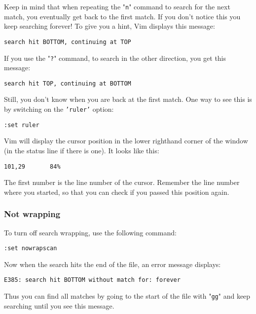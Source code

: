 Keep in mind that when repeating the "\texttt{n}" command to search for the next match, you eventually get back to the first match.
If you don't notice this you keep searching forever!  To give you a hint, Vim displays this message:

\begin{Verbatim}[samepage=true]
    search hit BOTTOM, continuing at TOP 
\end{Verbatim}

If you use the "\texttt{?}" command, to search in the other direction, you get this message:

\begin{Verbatim}[samepage=true]
    search hit TOP, continuing at BOTTOM 
\end{Verbatim}

Still, you don't know when you are back at the first match.
One way to see this is by switching on the \texttt{'ruler'} option:

\begin{Verbatim}[samepage=true]
 :set ruler
\end{Verbatim}

Vim will display the cursor position in the lower righthand corner of the window (in the status line if there is one).
It looks like this:

\begin{Verbatim}[samepage=true]
    101,29       84% 
\end{Verbatim}

The first number is the line number of the cursor.
Remember the line number where you started, so that you can check if you passed this position again.
\subsubsection{Not wrapping}
To turn off search wrapping, use the following command:

\begin{Verbatim}[samepage=true]
 :set nowrapscan
\end{Verbatim}

Now when the search hits the end of the file, an error message displays:

\begin{Verbatim}[samepage=true]
    E385: search hit BOTTOM without match for: forever 
\end{Verbatim}

Thus you can find all matches by going to the start of the file with "\texttt{gg}" and keep searching until you see this message.

